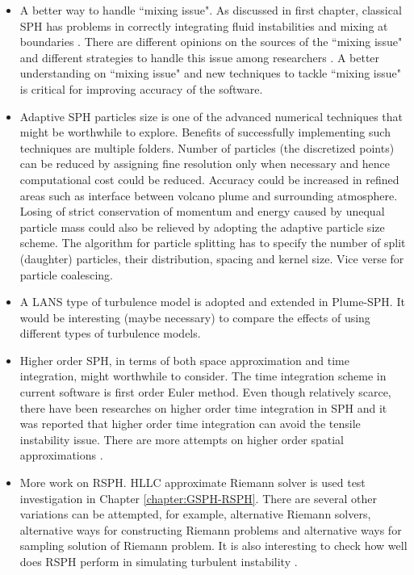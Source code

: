 \begin{itemize}
\item {A better way to handle ``mixing issue". As discussed in first chapter, classical SPH has problems in correctly integrating fluid instabilities and mixing at boundaries \citet{read2010resolving}. There are different opinions on the sources of the ``mixing issue" and different strategies to handle this issue among researchers \citep{chen1999improvement, ritchie2001multiphase, agertz2007fundamental, wadsley2008treatment, price2008modelling, read2010resolving, borgani2012hydrodynamic}. A better understanding on ``mixing issue" and new techniques to tackle ``mixing issue" is critical for improving accuracy of the software.}
\item Adaptive SPH particles size \citep{lopez2013dynamic, vacondio2016variable} is one of the advanced numerical techniques that might be worthwhile to explore. Benefits of successfully implementing such techniques are multiple folders. Number of particles (the discretized points) can be reduced by assigning fine resolution only when necessary and hence computational cost could be reduced. Accuracy could be increased in refined areas such as interface between volcano plume and surrounding atmosphere. Losing of strict conservation of momentum and energy caused by unequal particle mass could also be relieved by adopting the adaptive particle size scheme. The algorithm for particle splitting has to specify the number of split (daughter) particles, their distribution, spacing and kernel size. Vice verse for particle coalescing.
\item A LANS type of turbulence model is adopted and extended in Plume-SPH. It would be interesting (maybe necessary) to compare the effects of using different types of turbulence models.
\item Higher order SPH, in terms of both space approximation and time integration, might worthwhile to consider. The time integration scheme in current software is first order Euler method. Even though relatively scarce, there have been researches \citep{blanc2012stabilized} on higher order time integration in SPH and it was reported that higher order time integration can avoid the tensile instability issue. There are more attempts on higher order spatial approximations \citep{bonet1999variational, dilts1999moving, leonardi2014explicit, lind2016high}.
\item More work on RSPH. HLLC approximate Riemann solver is used test investigation in Chapter \ref{chapter:GSPH-RSPH}. There are several other variations can be attempted, for example, alternative Riemann solvers, alternative ways for constructing Riemann problems and alternative ways for sampling solution of Riemann problem. It is also interesting to check how well does RSPH perform in simulating turbulent instability \citep{price2008modelling,cha2010kelvin}. 
\end{itemize}

